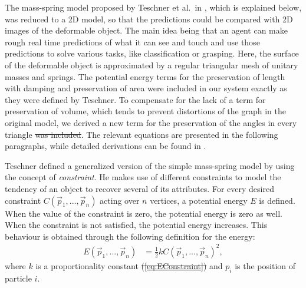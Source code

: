 \documentclass[journal]{IEEEtran}
\newcommand{\eref}[1]{(\ref{#1})}
\newcommand{\comment}[1]{{\color{red} #1}}
\begin{document}
The mass-spring model proposed by Teschner et al.\ in \cite{Teschner2004}, which is explained below, was reduced to a 2D model, so that the predictions could be compared with 2D images of the deformable object.  The main idea being that an agent can make rough real time predictions of what it can see and touch and use those predictions to solve various tasks, like classification or grasping.  Here, the surface of the deformable object is approximated by a regular triangular mesh of unitary masses and springs.  The potential energy terms for the preservation of length with damping and preservation of area were included in our system \comment{exactly as they were defined by Teschner}.  To compensate for the lack of a term for preservation of volume, which tends to prevent distortions of the graph \comment{in the original model}, \comment{we derived } a new term for the preservation of the angles \comment{in every triangle} \sout{was included}.  The relevant equations are presented in the following paragraphs, while detailed derivations can be found in \cite{Arriola2013thesis}.

\comment{Teschner defined a generalized version of the simple mass-spring model by using the concept of \emph{constraint}.  He makes use of different constraints to model the tendency of an object to recover several of its attributes.} For every desired constraint $C(\vec{p}_1,...,\vec{p}_{n})$ acting over $n$ vertices, a potential energy $E$ is defined.  When the value of the constraint is zero, the potential energy is zero as well.  When the constraint is not satisfied, the potential energy increases.  This behaviour is obtained through the following definition for the energy:
\begin{align}
 E(\vec{p}_1,...,\vec{p}_{n}) & = \frac{1}{2}kC(\vec{p}_1,...,\vec{p}_{n})^2, \label{eq:EConstraint}
\end{align}
where $k$ is a proportionality constant \comment{\sout{\eref{eq:EConstraint}}} and $p_i$ is the position of particle $i$.
\end{document}
